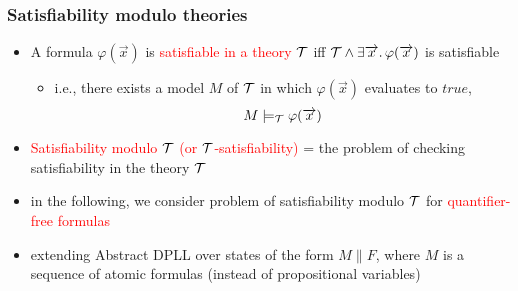 \documentclass[smaller]{beamer}
\newcommand{\state}[2]{{#1\parallel #2}}
\def\cT{{\cal T}}
\newcommand{\red}[1]{\textcolor{red}{#1}}
\begin{document}
\begin{frame}
\frametitle{Satisfiability modulo theories}
\begin{itemize}
\setlength\itemsep{2mm}
\item A formula $\varphi(\vec{x})$ is \red{satisfiable in a theory $\cT$} iff $\cT\land \exists\vec{x}\sep\varphi(\vec{x})$ is satisfiable
\vspace{2mm}
	\begin{itemize}
	\setlength\itemsep{2mm}
		\item i.e., there exists a model $M$ of $\cT$ in which $\varphi(\vec{x})$ evaluates to $true$, 
		\[
			M\models_\cT \varphi(\vec{x})
		\]
	\end{itemize}
\item \red{Satisfiability modulo $\cT$ (or $\cT$-satisfiability)} = the problem of checking satisfiability in the theory $\cT$
\item in the following, we consider problem of satisfiability modulo $\cT$ for \red{quantifier-free formulas}
\item extending Abstract DPLL over states of the form $\state{M}{F}$, where $M$ is a sequence of atomic formulas (instead of propositional variables)
\end{itemize}
\end{frame}
\end{document}
